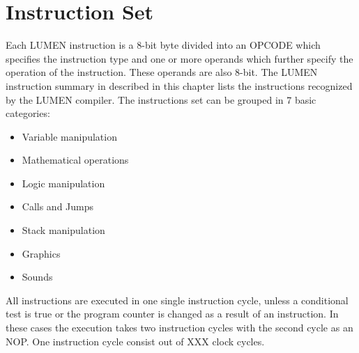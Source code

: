 \chapter{Instruction Set}
\label{cha:InstructionSet}

Each LUMEN instruction is a 8-bit byte divided into an OPCODE which specifies the instruction
type and one or more operands which further specify the operation of the instruction. These operands
are also 8-bit. The LUMEN instruction summary in described in this chapter lists the instructions recognized by the 
LUMEN compiler. The instructions set can be grouped in 7 basic categories:

	\begin{itemize}
		  \item Variable manipulation
		  \item Mathematical operations
		  \item Logic manipulation
		  \item Calls and Jumps
		  \item Stack manipulation
		  \item Graphics
		  \item Sounds
	\end{itemize}

\noindent All instructions are executed in one single instruction cycle, unless a conditional test is true
or the program counter is changed as a result of an instruction. In these cases the execution takes two instruction
cycles with the second cycle as an NOP. One instruction cycle consist out of XXX clock cycles.

\newpage


